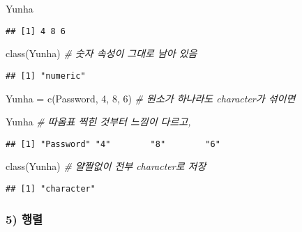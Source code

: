 \documentclass[
  12,
]{article}
\newenvironment{Shaded}{\begin{snugshade}}{\end{snugshade}}
\newcommand{\CommentTok}[1]{\textcolor[rgb]{0.56,0.35,0.01}{\textit{#1}}}
\newcommand{\DecValTok}[1]{\textcolor[rgb]{0.00,0.00,0.81}{#1}}
\newcommand{\FunctionTok}[1]{\textcolor[rgb]{0.00,0.00,0.00}{#1}}
\newcommand{\NormalTok}[1]{#1}
\newcommand{\OtherTok}[1]{\textcolor[rgb]{0.56,0.35,0.01}{#1}}
\newcommand{\StringTok}[1]{\textcolor[rgb]{0.31,0.60,0.02}{#1}}
\begin{document}
\begin{Shaded}
\begin{Highlighting}[]
\NormalTok{Yunha}
\end{Highlighting}
\end{Shaded}

\begin{verbatim}
## [1] 4 8 6
\end{verbatim}

\begin{Shaded}
\begin{Highlighting}[]
\FunctionTok{class}\NormalTok{(Yunha) }\CommentTok{\# 숫자 속성이 그대로 남아 있음}
\end{Highlighting}
\end{Shaded}

\begin{verbatim}
## [1] "numeric"
\end{verbatim}

\begin{Shaded}
\begin{Highlighting}[]
\NormalTok{Yunha }\OtherTok{=} \FunctionTok{c}\NormalTok{(}\StringTok{\textquotesingle{}Password\textquotesingle{}}\NormalTok{, }\DecValTok{4}\NormalTok{, }\DecValTok{8}\NormalTok{, }\DecValTok{6}\NormalTok{) }\CommentTok{\# 원소가 하나라도 character가 섞이면}
\end{Highlighting}
\end{Shaded}

\begin{Shaded}
\begin{Highlighting}[]
\NormalTok{Yunha }\CommentTok{\# 따옴표 찍힌 것부터 느낌이 다르고,}
\end{Highlighting}
\end{Shaded}

\begin{verbatim}
## [1] "Password" "4"        "8"        "6"
\end{verbatim}

\begin{Shaded}
\begin{Highlighting}[]
\FunctionTok{class}\NormalTok{(Yunha) }\CommentTok{\# 얄짤없이 전부 character로 저장}
\end{Highlighting}
\end{Shaded}

\begin{verbatim}
## [1] "character"
\end{verbatim}

\hypertarget{uxd589uxb82c}{%
\subsubsection{5) 행렬}\label{uxd589uxb82c}}
\end{document}
